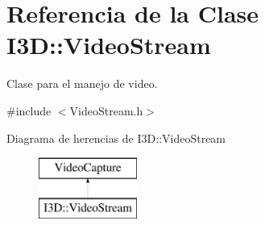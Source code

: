 \hypertarget{class_i3_d_1_1_video_stream}{}\section{Referencia de la Clase I3D\+:\+:Video\+Stream}
\label{class_i3_d_1_1_video_stream}


Clase para el manejo de video.  




{\ttfamily \#include $<$Video\+Stream.\+h$>$}

Diagrama de herencias de I3D\+:\+:Video\+Stream\begin{figure}[H]
\begin{center}
\leavevmode
\includegraphics[height=2.000000cm]{class_i3_d_1_1_video_stream}
\end{center}
\end{figure}

